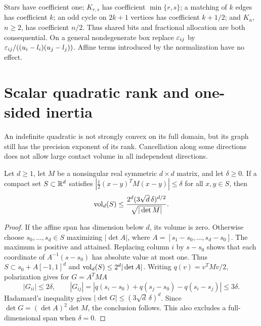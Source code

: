 Stars have coefficient one; $K_{r,s}$ has coefficient $\min\{r,s\}$;
a matching of $k$ edges has coefficient $k$; an odd cycle on $2k+1$
vertices has coefficient $k+1/2$; and $K_n$, $n\ge2$, has coefficient
$n/2$. Thus shared bits and fractional allocation are both consequential.
On a general nondegenerate box replace $\varepsilon_{ij}$ by
$\varepsilon_{ij}/((u_i-l_i)(u_j-l_j))$. Affine terms introduced by the
normalization have no effect.

\section{Scalar quadratic rank and one-sided inertia}\label{sec:scalar-quadratic}

An indefinite quadratic is not strongly convex on its full domain, but
its graph still has the precision exponent of its rank. Cancellation
along some directions does not allow large contact volume in all
independent directions.

\begin{lemma}\label{lem:indefinite-volume}
Let $d\ge1$, let $M$ be a nonsingular real symmetric $d\times d$ matrix,
and let $\delta\ge0$. If a compact set $S\subset\mathbb R^d$ satisfies
$|\tfrac12(x-y)^TM(x-y)|\le\delta$ for all $x,y\in S$, then
\[
 \operatorname{vol}_d(S)\le
 \frac{2^d(3\sqrt d\,\delta)^{d/2}}{\sqrt{|\det M|}}.
\]
\end{lemma}
\begin{proof}
If the affine span has dimension below $d$, its volume is zero.
Otherwise choose $s_0,\ldots,s_d\in S$ maximizing
$|\det A|$, where $A=[s_1-s_0,\ldots,s_d-s_0]$. The maximum is
positive and attained. Replacing column $i$ by $s-s_0$ shows that each
coordinate of $A^{-1}(s-s_0)$ has absolute value at most one. Thus
$S\subset s_0+A[-1,1]^d$ and $\operatorname{vol}_d(S)\le2^d|\det A|$.
Writing $q(v)=v^TMv/2$, polarization gives for $G=A^TMA$
\[
 |G_{ii}|\le2\delta,\qquad
 |G_{ij}|=|q(s_i-s_0)+q(s_j-s_0)-q(s_i-s_j)|\le3\delta.
\]
Hadamard's inequality gives
$|\det G|\le(3\sqrt d\,\delta)^d$. Since
$\det G=(\det A)^2\det M$, the conclusion follows. This also excludes
a full-dimensional span when $\delta=0$.
\end{proof}

